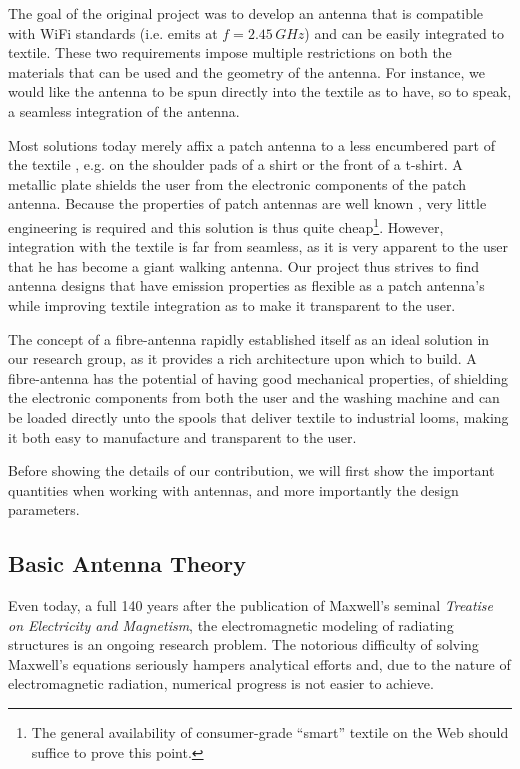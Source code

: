 The goal of the original project was to develop an antenna that is compatible with 
WiFi standards (i.e. emits at $f=2.45\,\unit{GHz}$) and can be easily integrated
to textile. These two requirements impose multiple restrictions on both
the materials that can be used and the geometry of the antenna. For instance, 
we would like the antenna to be spun directly into the textile as to have, 
so to speak, a seamless integration of the antenna.

Most solutions today merely affix a patch antenna to a less 
encumbered part of the textile \cite{CAT2004,JAI2013}, e.g. 
on the shoulder pads of a shirt or the front of a t-shirt.
A metallic plate shields the user from the electronic components 
of the patch antenna. Because the properties of patch antennas are
well known \cite{ELL2003}, very little engineering is required and this solution
is thus quite cheap\footnote{The general availability of consumer-grade ``smart''
textile on the Web should suffice to prove this point.}. However, integration 
with the textile is far from seamless, as it is very apparent to the
user that he has become a giant walking antenna. Our project thus 
strives to find antenna designs that have emission properties
as flexible as a patch antenna's while improving textile integration
as to make it transparent to the user.

The concept of a fibre-antenna rapidly established itself
as an ideal solution in our research group, as it provides a rich
architecture upon which to build. A fibre-antenna has the potential
of having good mechanical properties, of shielding the electronic
components from both the user and the washing machine and 
can be loaded directly unto the spools that deliver textile to industrial 
looms, making it both easy to manufacture and transparent to the user.

Before showing the details of our contribution, 
we will first show the important quantities when
working with antennas, and more importantly the design
parameters.

\subsection{Basic Antenna Theory}
Even today, a full 140 years after the publication of 
Maxwell's seminal \textit{Treatise on Electricity and Magnetism}, 
the electromagnetic modeling of radiating structures 
is an ongoing research problem. The notorious difficulty 
of solving Maxwell's equations seriously hampers analytical efforts
and, due to the nature of electromagnetic radiation, numerical
progress is not easier to achieve.

